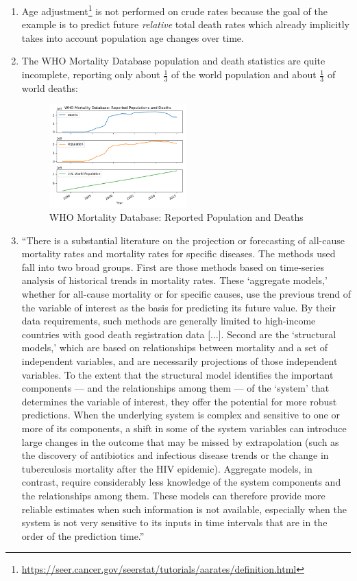 \documentclass[10pt, a4paper, twocolumn]{IEEEconf}
\begin{document}
\begin{enumerate}
\begin{enumerate}
    \end{enumerate}
  \item Age adjustment\footnote{\scriptsize{\url{https://seer.cancer.gov/seerstat/tutorials/aarates/definition.html}}} is not performed on crude rates because the goal of the example is to predict future \textit{relative} total death rates which already implicitly takes into account population age changes over time.
  \item The WHO Mortality Database population and death statistics are quite incomplete, reporting only about $\frac{1}{3}$ of the world population and about $\frac{1}{3}$ of world deaths:
    \begin{figure}[H]
      \centering
      \includegraphics[width=0.5\textwidth]{results/who_mortality_db_population_deaths.png}
      \caption{WHO Mortality Database: Reported Population and Deaths}
    \end{figure}
  \item \label{mathersquote} \enquote{There is a substantial literature on the projection or forecasting of all-cause mortality rates and mortality rates for specific diseases. The methods used fall into two broad groups. First are those methods based on time-series analysis of historical trends in mortality rates. These \enquote{aggregate models,} whether for all-cause mortality or for specific causes, use the previous trend of the variable of interest as the basis for predicting its future value. By their data requirements, such methods are generally limited to high-income countries with good death registration data [...]. Second are the \enquote{structural models,} which are based on relationships between mortality and a set of independent variables, and are necessarily projections of those independent variables. To the extent that the structural model identifies the important components — and the relationships among them — of the \enquote{system} that determines the variable of interest, they offer the potential for more robust predictions. When the underlying system is complex and sensitive to one or more of its components, a shift in some of the system variables can introduce large changes in the outcome that may be missed by extrapolation (such as the discovery of antibiotics and infectious disease trends or the change in tuberculosis mortality after the HIV epidemic). Aggregate models, in contrast, require considerably less knowledge of the system components and the relationships among them. These models can therefore provide more reliable estimates when such information is not available, especially when the system is not very sensitive to its inputs in time intervals that are in the order of the prediction time.}\cite{mathers2006projections}

\end{enumerate}
\end{document}
